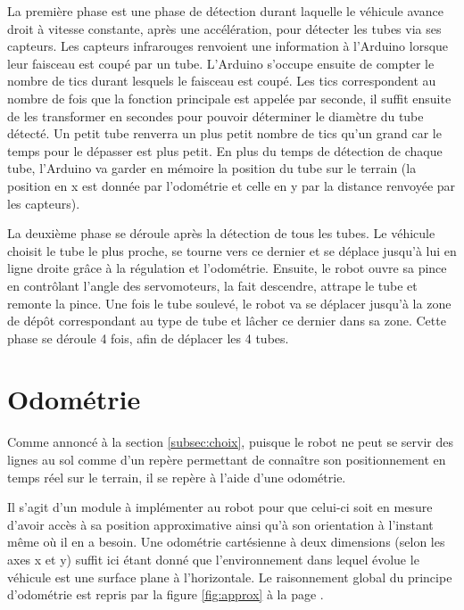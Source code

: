 \documentclass[a4paper,11pt]{article}
\begin{document}
La première phase est une phase de détection durant laquelle le véhicule avance droit à vitesse constante, après une accélération, pour détecter les tubes via ses capteurs. Les capteurs infrarouges renvoient une information à l'Arduino lorsque leur faisceau est coupé par un tube. L'Arduino s'occupe ensuite de compter le nombre de tics durant lesquels le faisceau est coupé. Les tics correspondent au nombre de fois que la fonction principale est appelée par seconde, il suffit ensuite de les transformer en secondes pour pouvoir déterminer le diamètre du tube détecté. Un petit tube renverra un plus petit nombre de tics qu'un grand car le temps pour le dépasser est plus petit. En plus du temps de détection de chaque tube, l'Arduino va garder en mémoire la position du tube sur le terrain (la position en x est donnée par l'odométrie et celle en y par la distance renvoyée par les capteurs).

La deuxième phase se déroule après la détection de tous les tubes. Le véhicule choisit le tube le plus proche, se tourne vers ce dernier et se déplace jusqu'à lui en ligne droite grâce à la régulation et l'odométrie. Ensuite, le robot ouvre sa pince en contrôlant l'angle des servomoteurs, la fait descendre, attrape le tube et remonte la pince. Une fois le tube soulevé, le robot va se déplacer jusqu'à la zone de dépôt correspondant au type de tube et lâcher ce dernier dans sa zone. Cette phase se déroule 4 fois, afin de déplacer les 4 tubes.
\clearpage

\section{\label{sec:odo}Odométrie}

Comme annoncé à la section \ref{subsec:choix}, puisque le robot ne peut se servir des lignes au sol comme d'un repère permettant de connaître son positionnement en temps réel sur le terrain, il se repère à l'aide d'une odométrie.

Il s'agit d'un module à implémenter au robot pour que celui-ci soit en mesure d'avoir accès à sa position approximative ainsi qu'à son orientation à l'instant même où il en a besoin. Une odométrie cartésienne à deux dimensions (selon les axes x et y) suffit ici étant donné que l'environnement dans lequel évolue le véhicule est une surface plane à l'horizontale. Le raisonnement global du principe d'odométrie est repris par la figure \ref{fig:approx} à la page \pageref{fig:approx}.
\end{document}
